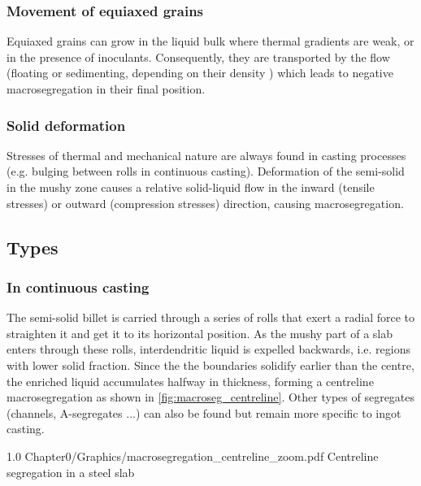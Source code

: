 \subsubsection*{Movement of equiaxed grains}
Equiaxed grains can grow in the liquid bulk where thermal gradients are weak, or in the presence of inoculants. Consequently, 
they are transported by the flow (floating or sedimenting, depending on their density \citep{beckermann_modelling_2002}) which leads to negative macrosegregation in their final position.

\subsubsection{Solid deformation} 
Stresses of thermal and mechanical nature are always found in casting processes (e.g. bulging between rolls in continuous casting). 
Deformation of the semi-solid in the mushy zone causes a relative solid-liquid flow in the inward (tensile stresses) or outward (compression stresses) direction, causing macrosegregation.
\subsection{Types}
\subsubsection*{In continuous casting}
The semi-solid billet is carried through a series of rolls that exert a radial force to straighten it and get it to its horizontal position.
As the mushy part of a slab enters through these rolls, interdendritic liquid is expelled backwards, i.e. regions with lower solid fraction.
Since the the boundaries solidify earlier than the centre, the enriched liquid accumulates halfway in thickness, forming a centreline macrosegregation
as shown in \cref{fig:macroseg_centreline}. Other types of segregates (channels, A-segregates ...) can also be found but remain more specific to ingot casting. 
\begin{figureth}
{1.0}
{Chapter0/Graphics/macrosegregation_centreline_zoom.pdf}
{Centreline segregation in a steel slab \citep{beckermann_modelling_2002}}
\label{fig:macroseg_centreline}
\end{figureth}
